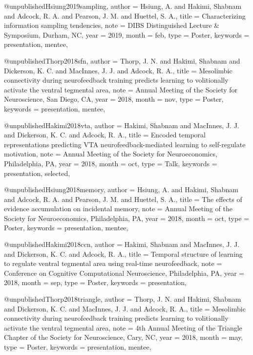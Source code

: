 @unpublished{Hsiung2019sampling,
  author   = {Hsiung, A. and Hakimi, Shabnam and Adcock, R. A.
              and Pearson, J. M. and Huettel, S. A.},
  title    = {Characterizing information sampling tendencies},
  note     = {DIBS Distinguished Lecture \& Symposium, Durham, NC},
  year     = {2019},
  month    = feb,
  type     = {Poster},
  keywords = {presentation, mentee},
}


@unpublished{Thorp2018sfn,
  author   = {Thorp, J. N. and Hakimi, Shabnam and Dickerson, K. C.
              and MacInnes, J. J. and Adcock, R. A.},
  title    = {Mesolimbic connectivity during neurofeedback training predicts
              learning to volitionally activate the ventral tegmental area},
  note     = {Annual Meeting of the Society for Neuroscience, San Diego, CA},
  year     = {2018},
  month    = nov,
  type     = {Poster},
  keywords = {presentation, mentee},
}

@unpublished{Hakimi2018vta,
  author   = {Hakimi, Shabnam and MacInnes, J. J. and Dickerson, K. C.
              and Adcock, R. A.},
  title    = {Encoded temporal representations predicting {VTA}
              neurofeedback-mediated learning to self-regulate motivation},
  note     = {Annual Meeting of the Society for Neuroeconomics,
              Philadelphia, PA},
  year     = {2018},
  month    = oct,
  type     = {Talk},
  keywords = {presentation, selected},
}

@unpublished{Hsiung2018memory,
  author   = {Hsiung, A. and Hakimi, Shabnam and Adcock, R. A.
              and Pearson, J. M. and Huettel, S. A.},
  title    = {The effects of evidence accumulation on incidental memory},
  note     = {Annual Meeting of the Society for Neuroeconomics,
              Philadelphia, PA},
  year     = {2018},
  month    = oct,
  type     = {Poster},
  keywords = {presentation, mentee},
}

@unpublished{Hakimi2018ccn,
  author   = {Hakimi, Shabnam and MacInnes, J. J. and Dickerson, K. C.
              and Adcock, R. A.},
  title    = {Temporal structure of learning to regulate ventral tegmental
              area using real-time neurofeedback},
  note     = {Conference on Cognitive Computational Neuroscience,
              Philadelphia, PA},
  year     = {2018},
  month    = sep,
  type     = {Poster},
  keywords = {presentation},
}

@unpublished{Thorp2018triangle,
  author   = {Thorp, J. N. and Hakimi, Shabnam and Dickerson, K. C.
              and MacInnes, J. J. and Adcock, R. A.},
  title    = {Mesolimbic connectivity during neurofeedback training predicts
              learning to volitionally activate the ventral tegmental area},
  note     = {4th Annual Meeting of the Triangle Chapter of the Society
              for Neuroscience, Cary, NC},
  year     = {2018},
  month    = may,
  type     = {Poster},
  keywords = {presentation, mentee},
}

